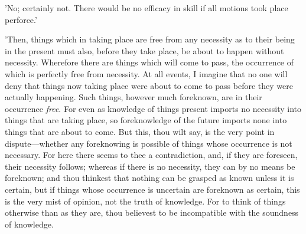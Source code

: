 'No; certainly not. There would be no efficacy in skill if all motions
took place perforce.'

'Then, things which in taking place are free from any necessity as to
their being in the present must also, before they take place, be about
to happen without necessity. Wherefore there are things which will come
to pass, the occurrence of which is perfectly free from necessity. At
all events, I imagine that no one will deny that things now taking place
were about to come to pass before they were actually happening. Such
things, however much foreknown, are in their occurrence \emph{free}. For even
as knowledge of things present imports no necessity into things that are
taking place, so foreknowledge of the future imports none into things
that are about to come. But this, thou wilt say, is the very point in
dispute—whether any foreknowing is possible of things whose occurrence
is not necessary. For here there seems to thee a contradiction, and, if
they are foreseen, their necessity follows; whereas if there is no
necessity, they can by no means be foreknown; and thou thinkest that
nothing can be grasped as known unless it is certain, but if things
whose occurrence is uncertain are foreknown as certain, this is the very
mist of opinion, not the truth of knowledge. For to think of things
otherwise than as they are, thou believest to be incompatible with the
soundness of knowledge.


